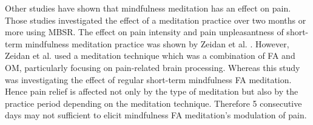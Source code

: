Other studies have shown that mindfulness meditation has an effect on pain. Those studies investigated the effect of a meditation practice over two months or more using MBSR. \cite{Kabat1982,Rosenzweig2010} The effect on pain intensity and pain unpleasantness of short-term mindfulness meditation practice was shown by Zeidan et al. \cite{Zeidan2012}. However, Zeidan et al. \cite{Zeidan2012} used a meditation technique which was a combination of FA and OM, particularly focusing on pain-related brain processing. Whereas this study was investigating the effect of regular short-term mindfulness FA meditation. Hence pain relief is affected not only by the type of meditation but also by the practice period depending on the meditation technique. Therefore 5 consecutive days may not sufficient to elicit mindfulness FA meditation’s modulation of pain.





